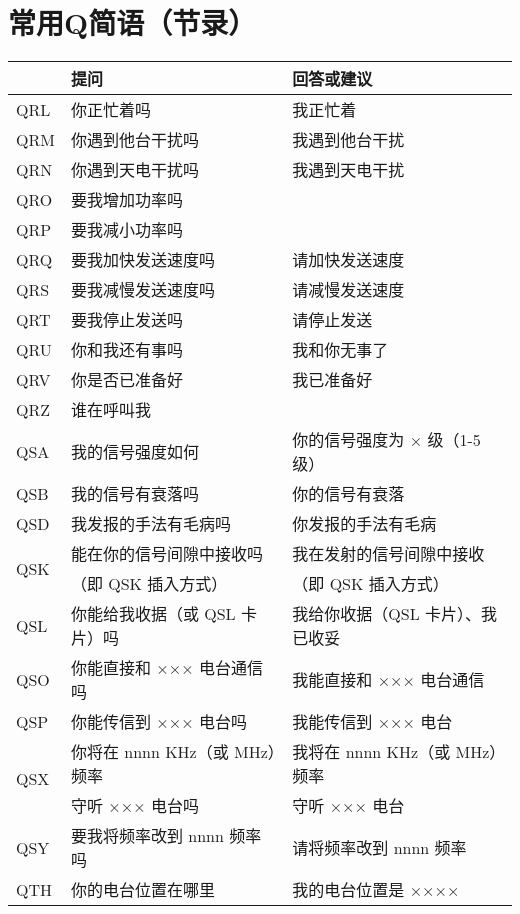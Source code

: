 \newpage

\section{常用Q简语（节录）}

\begin{longtable}{|l|l|l|}
	\hline
	 & \textbf{提问} & \textbf{回答或建议} \\
	\hline
	QRL & 你正忙着吗 & 我正忙着 \\
	\hline
	QRM & 你遇到他台干扰吗 & 我遇到他台干扰 \\
	\hline
	QRN & 你遇到天电干扰吗 & 我遇到天电干扰 \\
	\hline
	QRO & 要我增加功率吗 & \\
	\hline
	QRP & 要我减小功率吗 & \\
	\hline
	QRQ & 要我加快发送速度吗 & 请加快发送速度 \\
	\hline
	QRS & 要我减慢发送速度吗 & 请减慢发送速度 \\
	\hline
	QRT & 要我停止发送吗 & 请停止发送 \\
	\hline
	QRU & 你和我还有事吗 & 我和你无事了 \\
	\hline
	QRV & 你是否已准备好 & 我已准备好 \\
	\hline
	QRZ & 谁在呼叫我 & \\
	\hline
	QSA & 我的信号强度如何 & 你的信号强度为 × 级（1-5 级） \\
	\hline
	QSB & 我的信号有衰落吗 & 你的信号有衰落 \\
	\hline
	QSD & 我发报的手法有毛病吗 & 你发报的手法有毛病 \\
	\hline
	\multirow{2}{1em}{QSK} & 能在你的信号间隙中接收吗 & 我在发射的信号间隙中接收 \\
	& （即 QSK 插入方式）    & （即 QSK 插入方式） \\
	\hline
	QSL & 你能给我收据（或 QSL 卡片）吗 & 我给你收据（QSL 卡片）、我已收妥 \\
	\hline
	QSO & 你能直接和 ××× 电台通信吗 & 我能直接和 ××× 电台通信 \\
	\hline
	QSP & 你能传信到 ××× 电台吗 & 我能传信到 ××× 电台 \\
	\hline
	\multirow{2}{1em}{QSX} & 你将在 nnnn KHz（或 MHz）频率 & 我将在 nnnn KHz（或 MHz）频率 \\
	    & 守听 ××× 电台吗 & 守听 ××× 电台 \\
	\hline
	QSY & 要我将频率改到 nnnn 频率吗 & 请将频率改到 nnnn 频率 \\
	\hline
	QTH & 你的电台位置在哪里 & 我的电台位置是 ×××× \\
	\hline
\end{longtable}


